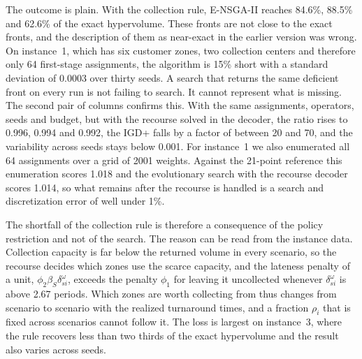 \documentclass[11pt, a4paper]{article}
\begin{document}
\protect\hypertarget{tab:Exact}{}{}
The outcome is plain. With the collection rule, E-NSGA-II reaches 84.6\%, 88.5\% and 62.6\% of the exact hypervolume. These fronts are not close to the exact fronts, and the description of them as near-exact in the earlier version was wrong. On instance~1, which has six customer zones, two collection centers and therefore only 64 first-stage assignments, the algorithm is 15\% short with a standard deviation of 0.0003 over thirty seeds. A search that returns the same deficient front on every run is not failing to search. It cannot represent what is missing. The second pair of columns confirms this. With the same assignments, operators, seeds and budget, but with the recourse solved in the decoder, the ratio rises to 0.996, 0.994 and 0.992, the IGD+ falls by a factor of between 20 and 70, and the variability across seeds stays below 0.001. For instance~1 we also enumerated all 64 assignments over a grid of 2001 weights. Against the 21-point reference this enumeration scores 1.018 and the evolutionary search with the recourse decoder scores 1.014, so what remains after the recourse is handled is a search and discretization error of well under 1\%.

The shortfall of the collection rule is therefore a consequence of the policy restriction and not of the search. The reason can be read from the instance data. Collection capacity is far below the returned volume in every scenario, so the recourse decides which zones use the scarce capacity, and the lateness penalty of a unit, $\phi_2\beta_S\delta_{si}^{\omega}$, exceeds the penalty $\phi_1$ for leaving it uncollected whenever $\delta_{si}^{\omega}$ is above 2.67 periods. Which zones are worth collecting from thus changes from scenario to scenario with the realized turnaround times, and a fraction $\rho_i$ that is fixed across scenarios cannot follow it. The loss is largest on instance~3, where the rule recovers less than two thirds of the exact hypervolume and the result also varies across seeds.
\end{document}
